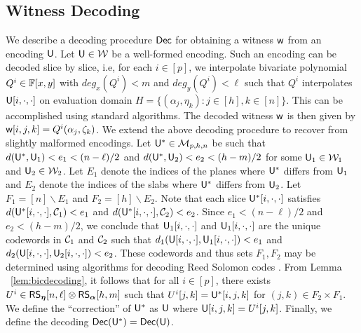 \subsection{Witness Decoding}\label{sec:witdecoding}
We describe a decoding procedure $\mathsf{Dec}$ for obtaining a witness $\mathsf{w}$ from an encoding
$\mathsf{U}$. Let $\mathsf{U}\in \mathcal{W}$ be a well-formed encoding. Such an encoding can
be decoded slice by slice, i.e, for each $i\in [p]$, we interpolate bivariate
polynomial $Q^i\in \mathbb{F}[x,y]$ with $deg_x(Q^i)<m$ and $deg_y(Q^i)<\ell$ such that
$Q^i$ interpolates $\mathsf{U}[i,\cdot,\cdot]$ on evaluation domain $H=\{(\alpha_j,\eta_k): j\in [h],
k\in [n]\}$. This can be accomplished using
standard algorithms. The decoded witness $\mathsf{w}$ is then given by
$\mathsf{w}[i,j,k]=Q^i(\alpha_j,\zeta_k)$. We extend the above decoding procedure to
recover from slightly malformed encodings. Let $\mathsf{U}^*\in \mathcal{M}_{p,h,n}$ be such
that $d(\mathsf{U}^*,\mathsf{U}_1)<e_1 <(n-\ell)/2 $ and $d(\mathsf{U}^*,\mathsf{U}_2)<e_2 <(h-m)/2$ for some $\mathsf{U}_1\in
\mathcal{W}_1$ and $\mathsf{U}_2\in \mathcal{W}_2$. Let $E_1$ denote
the indices of the planes where $\mathsf{U}^*$ differs from $\mathsf{U}_1$ and 
$E_2$ denote the indices of the slabs where $\mathsf{U}^*$ differs from $\mathsf{U}_2$.
Let $F_1=[n]\backslash E_1$ and
$F_2=[h]\backslash E_2$. Note that each
slice $\mathsf{U}^*[i,\cdot,\cdot]$ satisfies
$d(\mathsf{U}^*[i,\cdot,\cdot],\mathcal{C}_1)<e_1$  and
$d(\mathsf{U}^*[i,\cdot,\cdot],\mathcal{C}_2)<e_2$. Since $e_1<(n-\ell)/2$ and
$e_2<(h-m)/2$, we conclude that $\mathsf{U}_1[i,\cdot,\cdot]$ and
$\mathsf{U}_1[i,\cdot,\cdot]$ are the unique codewords in $\mathcal{C}_1$ and $\mathcal{C}_2$
such that $d_1(\mathsf{U}[i,\cdot,\cdot],\mathsf{U}_1[i,\cdot,\cdot])<e_1$ and
$d_2(\mathsf{U}[i,\cdot,\cdot],\mathsf{U}_2[i,\cdot,\cdot])<e_2$. These codewords and thus
sets $F_1,F_2$ may be
determined using algorithms for decoding Reed Solomon codes \cite{CodingTheory}.
 From Lemma ~\ref{lem:bicdecoding}, it follows that for all $i\in [p]$, there exists $U^i\in \mathsf{RS}_{\bm{\eta}}[n,\ell]\otimes \mathsf{RS}_{\bm{\alpha}}[h,m]$ such
that $U^i[j,k]=\mathsf{U}^*[i,j,k]$ for $(j,k)\in F_2\times F_1$. We define the
``correction'' of $\mathsf{U}^*$ as $\mathsf{U}$ where
$\mathsf{U}[i,j,k]=U^i[j,k]$. Finally, we define the decoding $\mathsf{Dec}(\mathsf{U}^*) =
\mathsf{Dec}(\mathsf{U})$.


